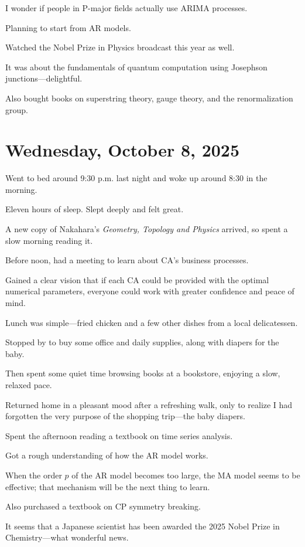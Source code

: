 \documentclass[uplatex]{jsarticle}
\begin{document}
I wonder if people in P-major fields actually use ARIMA processes.

Planning to start from AR models.

Watched the Nobel Prize in Physics broadcast this year as well.

It was about the fundamentals of quantum computation using Josephson junctions—delightful.

Also bought books on superstring theory, gauge theory, and the renormalization group.


\section{Wednesday, October 8, 2025}

Went to bed around 9:30 p.m. last night and woke up around 8:30 in the morning.

Eleven hours of sleep. Slept deeply and felt great.

A new copy of Nakahara's \textit{Geometry, Topology and Physics} arrived, so spent a slow morning reading it.

Before noon, had a meeting to learn about CA's business processes.

Gained a clear vision that if each CA could be provided with the optimal numerical parameters, everyone could work with greater confidence and peace of mind.

Lunch was simple—fried chicken and a few other dishes from a local delicatessen.

Stopped by to buy some office and daily supplies, along with diapers for the baby.

Then spent some quiet time browsing books at a bookstore, enjoying a slow, relaxed pace.

Returned home in a pleasant mood after a refreshing walk, only to realize I had forgotten the very purpose of the shopping trip—the baby diapers.

Spent the afternoon reading a textbook on time series analysis.

Got a rough understanding of how the AR model works.

When the order $p$ of the AR model becomes too large, the MA model seems to be effective; that mechanism will be the next thing to learn.

Also purchased a textbook on CP symmetry breaking.

It seems that a Japanese scientist has been awarded the 2025 Nobel Prize in Chemistry—what wonderful news.
\end{document}
